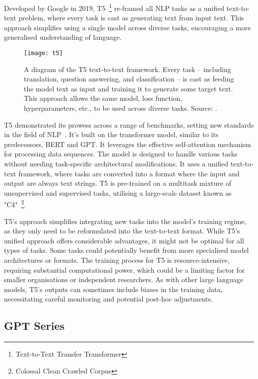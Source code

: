 Developed by Google in 2019, T5~\footnote{Text-to-Text Transfer Transformer} re-framed all NLP tasks as a unified text-to-text problem, where every task is cast as generating text from input text.
This approach simplifies using a single model across diverse tasks, encouraging a more generalised understanding of language.

\begin{figure}[h!]
	\centering
	\texttt{[image: t5]}
	\caption{A diagram of the T5 text-to-text framework. Every task -- including translation, question answering, and classification -- is cast as feeding the model text as input and training it to generate some target text. This approach allows the same model, loss function, hyperparameters, etc., to be used across diverse tasks. Source: \protect\textcite{raffel2023exploring}.}
	\label{fig:t5-t2t}
\end{figure}

T5 demonstrated its prowess across a range of benchmarks, setting new standards in the field of NLP~\cite{raffel2023exploring}.
It's built on the transformer model, similar to its predecessors, BERT and GPT. It leverages the effective self-attention mechanism for processing data sequences.
The model is designed to handle various tasks without needing task-specific architectural modifications.
It uses a unified text-to-text framework, where tasks are converted into a format where the input and output are always text strings.
T5 is pre-trained on a multitask mixture of unsupervised and supervised tasks, utilising a large-scale dataset known as "C4"~\footnote{Colossal Clean Crawled Corpus}.

T5's approach simplifies integrating new tasks into the model's training regime, as they only need to be reformulated into the text-to-text format.
While T5's unified approach offers considerable advantages, it might not be optimal for all types of tasks.
Some tasks could potentially benefit from more specialised model architectures or formats.
The training process for T5 is resource-intensive, requiring substantial computational power, which could be a limiting factor for smaller organisations or independent researchers.
As with other large language models, T5's outputs can sometimes include biases in the training data, necessitating careful monitoring and potential post-hoc adjustments.

\subsection{GPT Series}
\label{subsec:gpt-series}

